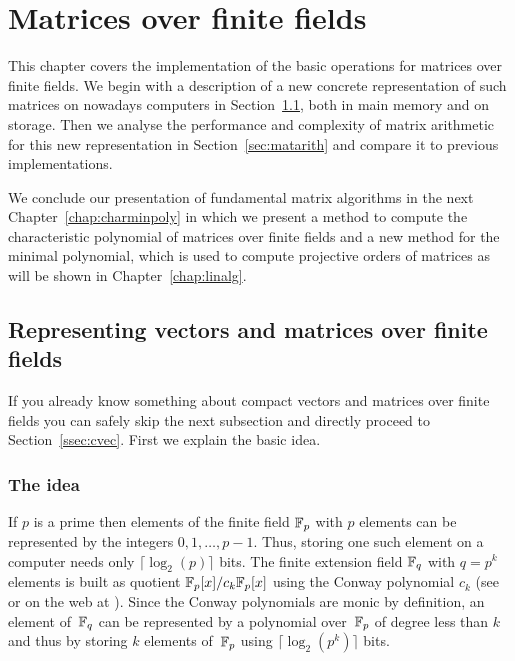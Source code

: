 
\chapter{Matrices over finite fields}
\label{chap:cmats}

This chapter covers the implementation of the basic operations for matrices 
over finite fields. We begin with a description of a new concrete 
representation of such matrices on nowadays computers in 
Section~\ref{sec:ffematrices}, both in main memory and on storage.
Then we analyse the performance and complexity of matrix arithmetic 
for this new representation in Section~\ref{sec:matarith} and compare
it to previous implementations. 

We conclude our presentation of fundamental matrix algorithms
in the next Chapter~\ref{chap:charminpoly} 
in which we present a method to compute the characteristic
polynomial of matrices over finite fields and a new method
for the minimal polynomial, which is used to compute projective orders
of matrices as will be shown in Chapter~\ref{chap:linalg}.


\section{Representing vectors and matrices over finite fields}
\label{sec:ffematrices}

If you already know something about compact vectors and matrices over 
finite fields you can safely skip the next subsection and directly
proceed to Section~\ref{ssec:cvec}. First we explain the basic idea.

\subsection{The idea}

If $p$ is a prime then elements of the finite field $\mathbb{F}_p$ with $p$
elements can be represented by the integers $0, 1, \ldots, p-1$. Thus,
storing one such element on a computer needs only $\lceil \log_2(p)
\rceil$ bits. The finite extension field  $\mathbb{F}_q$ with $q = p^k$ elements 
is built
as quotient $\mathbb{F}_p[x]/c_k \mathbb{F}_p[x]$ using the Conway polynomial
%
$c_k$ (see \cite{Nickel} or on the web at \cite{ConwayFL}). Since the
Conway polynomials are monic by definition, an element
of\, $\mathbb{F}_q$ can be represented by a polynomial over\, $\mathbb{F}_p$ of degree 
less than $k$ and thus by storing $k$ elements of\, $\mathbb{F}_p$ using $\lceil
\log_2(p^k) \rceil$ bits.

